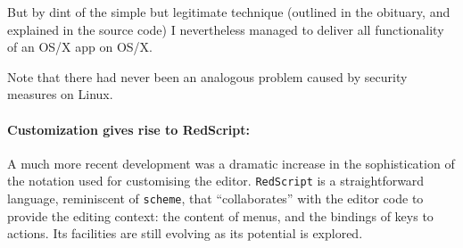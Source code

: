 \documentclass[
]{article}
\begin{document}
But by dint of the simple but legitimate technique (outlined in the
obituary, and explained in the source code) I nevertheless managed to
deliver all functionality of an OS/X app on OS/X.

Note that there had never been an analogous problem caused by security
measures on Linux.

\hypertarget{customization-gives-rise-to-redscript}{%
\paragraph{Customization gives rise to
RedScript:}\label{customization-gives-rise-to-redscript}}

A much more recent development was a dramatic increase in the
sophistication of the notation used for customising the editor.
\texttt{RedScript} is a straightforward language, reminiscent of
\texttt{scheme}, that ``collaborates'' with the editor code to provide
the editing context: the content of menus, and the bindings of keys to
actions. Its facilities are still evolving as its potential is explored.
\end{document}
